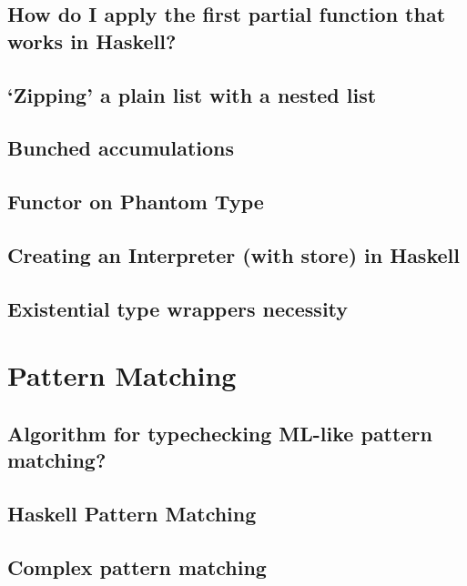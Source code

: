 \documentclass{book}
\begin{document}
\section{How do I apply the first partial function that works in Haskell?}


\section{`Zipping' a plain list with a nested list}


\section{Bunched accumulations}


\section{Functor on Phantom Type}


\section{Creating an Interpreter (with store) in Haskell}


\section{Existential type wrappers necessity}



\chapter{Pattern Matching}

\section{Algorithm for typechecking ML-like pattern matching?}


\section{Haskell Pattern Matching}


\section{Complex pattern matching}

\end{document}
